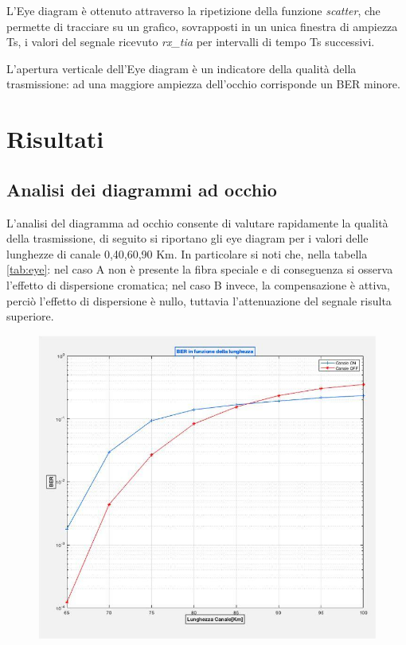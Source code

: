 \documentclass[12pt, a4paper]{article}
\begin{document}
L'Eye diagram è ottenuto attraverso la ripetizione della funzione \textit{scatter}, che permette di tracciare su un grafico, sovrapposti in un unica finestra di ampiezza Ts, i valori del segnale ricevuto \textit{rx\_tia} per intervalli di tempo Ts successivi.

L'apertura verticale dell'Eye diagram è un indicatore della qualità della trasmissione: ad una maggiore ampiezza dell'occhio corrisponde un BER minore.




\newpage
\section{Risultati}
\label{sec:Ris}

\subsection{Analisi dei diagrammi ad occhio}
\label{sub:eye}

L'analisi del diagramma ad occhio consente di valutare rapidamente la qualità della trasmissione, di seguito si riportano gli eye diagram per i valori delle lunghezze di canale 0,40,60,90 Km.
In particolare si noti che, nella tabella \ref{tab:eye}: nel caso A non è presente la fibra speciale e di conseguenza si osserva l'effetto di dispersione cromatica; nel caso B invece, la compensazione è attiva, perciò l'effetto di dispersione è nullo, tuttavia l'attenuazione del segnale risulta superiore.



\begin{figure}[h!]
\centering
\includegraphics[scale=0.6]{compensazioneBERlen.jpg}
\caption{}
\label{BERcomp}
\end{figure}
\end{document}
